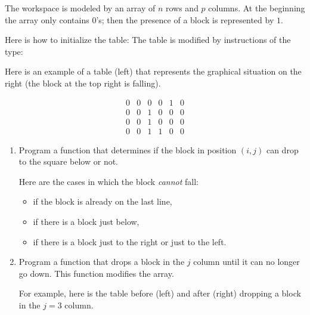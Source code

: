 \documentclass[11pt,class=report,crop=false]{standalone}
\begin{document}
\begin{activite}


The workspace is modeled by an array of $n$ rows and $p$ columns. At the beginning the array only contains $0$'s;
 then the presence of a block is represented by $1$.

Here is how to initialize the table:
The table is modified by instructions of the type:


Here is an example of a table (left) that represents the graphical situation on the right (the block at the top right is falling).

\begin{center}
\begin{minipage}{0.3\textwidth}
$$\begin{array}{cccccc}
0&0&0&0&1&0\\
0&0&1&0&0&0\\
0&0&1&0&0&0\\
0&0&1&1&0&0
\end{array}$$
\end{minipage}
\begin{minipage}{0.4\textwidth}
\end{minipage}
\end{center}

\begin{enumerate}
  \item Program a  function that determines if the block in position $(i,j)$ can drop to the square below or not.
  
  Here are the cases in which the block \emph{cannot} fall:
  \begin{itemize}
    \item if the block is already on the last line,
    \item if there is a block just below,
    \item if there is a block just to the right or just to the left.
  \end{itemize}
  
  \item Program a  function
that drops a block in the $j$ column until it can no longer go down.
This function modifies the array.  
  
  For example, here is the table before (left) and after (right) dropping a block in the $j=3$ column.  
  

\end{enumerate}
\end{activite}
\end{document}
